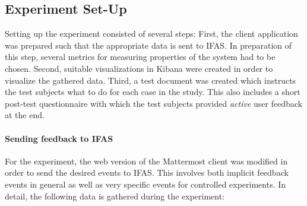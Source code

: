 \subsection{Experiment Set-Up}

Setting up the experiment consisted of several steps:
First, the client application was prepared such that the appropriate data is sent to \ac{IFAS}.
In preparation of this step, several metrics for measuring properties of the system had to be chosen.
Second, suitable visualizations in Kibana were created in order to visualize the gathered data.
Third, a test document was created which instructs the test subjects what to do for each case in the study.
This also includes a short post-test questionnaire with which the test subjects provided \emph{active} user feedback at the end.

\paragraph{Sending feedback to IFAS}

For the experiment, the web version of the Mattermost client was modified in order to send the desired events to \ac{IFAS}.
This involves both implicit feedback events in general as well as very specific events for controlled experiments.
In detail, the following data is gathered during the experiment:

